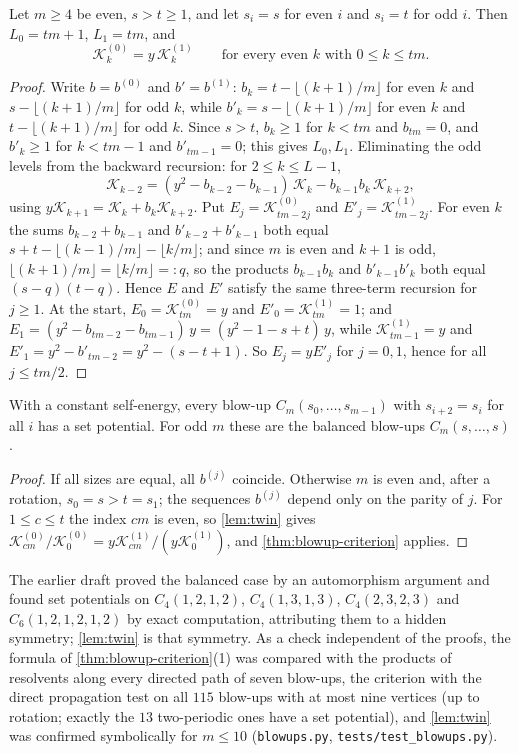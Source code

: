 \documentclass[final]{siamart0516}
\numberwithin{theorem}{section}
\numberwithin{equation}{section}
\theoremstyle{siamnonum}
\theoremstyle{plain}
\newcommand{\code}[1]{{\ttfamily\nolinkurl{#1}}}
\newcommand{\cont}{\mathcal{K}}           %
\begin{document}
\begin{lemma}\label{lem:twin}
Let $m\ge4$ be even, $s>t\ge1$, and let $s_i=s$ for even $i$ and $s_i=t$ for odd $i$. Then $L_0=tm+1$, $L_1=tm$, and
\[
\cont^{(0)}_k=y\,\cont^{(1)}_k\qquad\text{for every even }k\text{ with }0\le k\le tm.
\]
\end{lemma}
\begin{proof}
Write $b=b^{(0)}$ and $b'=b^{(1)}$: $b_k=t-\lfloor(k+1)/m\rfloor$ for even $k$ and $s-\lfloor(k+1)/m\rfloor$ for odd $k$, while $b'_k=s-\lfloor(k+1)/m\rfloor$ for even $k$ and $t-\lfloor(k+1)/m\rfloor$ for odd $k$. Since $s>t$, $b_k\ge1$ for $k<tm$ and $b_{tm}=0$, and $b'_k\ge1$ for $k<tm-1$ and $b'_{tm-1}=0$; this gives $L_0,L_1$. Eliminating the odd levels from the backward recursion: for $2\le k\le L-1$,
\[
\cont_{k-2}=(y^{2}-b_{k-2}-b_{k-1})\,\cont_k-b_{k-1}b_k\,\cont_{k+2},
\]
using $y\cont_{k+1}=\cont_k+b_k\cont_{k+2}$. Put $E_j=\cont^{(0)}_{tm-2j}$ and $E'_j=\cont^{(1)}_{tm-2j}$. For even $k$ the sums $b_{k-2}+b_{k-1}$ and $b'_{k-2}+b'_{k-1}$ both equal $s+t-\lfloor(k-1)/m\rfloor-\lfloor k/m\rfloor$; and since $m$ is even and $k+1$ is odd, $\lfloor(k+1)/m\rfloor=\lfloor k/m\rfloor=:q$, so the products $b_{k-1}b_k$ and $b'_{k-1}b'_k$ both equal $(s-q)(t-q)$. Hence $E$ and $E'$ satisfy the same three-term recursion for $j\ge1$. At the start, $E_0=\cont^{(0)}_{tm}=y$ and $E'_0=\cont^{(1)}_{tm}=1$; and $E_1=(y^{2}-b_{tm-2}-b_{tm-1})\,y=(y^{2}-1-s+t)\,y$, while $\cont^{(1)}_{tm-1}=y$ and $E'_1=y^{2}-b'_{tm-2}=y^{2}-(s-t+1)$. So $E_j=yE'_j$ for $j=0,1$, hence for all $j\le tm/2$.
\end{proof}

\begin{corollary}\label{cor:two-periodic}
With a constant self-energy, every blow-up $C_m(s_0,\dots,s_{m-1})$ with $s_{i+2}=s_i$ for all $i$ has a set potential. For odd $m$ these are the balanced blow-ups $C_m(s,\dots,s)$.
\end{corollary}
\begin{proof}
If all sizes are equal, all $b^{(j)}$ coincide. Otherwise $m$ is even and, after a rotation, $s_0=s>t=s_1$; the sequences $b^{(j)}$ depend only on the parity of $j$. For $1\le c\le t$ the index $cm$ is even, so \cref{lem:twin} gives $\cont^{(0)}_{cm}/\cont^{(0)}_0=y\cont^{(1)}_{cm}/(y\cont^{(1)}_0)$, and \cref{thm:blowup-criterion} applies.
\end{proof}

The earlier draft proved the balanced case by an automorphism argument and found set potentials on $C_4(1,2,1,2)$, $C_4(1,3,1,3)$, $C_4(2,3,2,3)$ and $C_6(1,2,1,2,1,2)$ by exact computation, attributing them to a hidden symmetry; \cref{lem:twin} is that symmetry. As a check independent of the proofs, the formula of \cref{thm:blowup-criterion}(1) was compared with the products of resolvents along every directed path of seven blow-ups, the criterion with the direct propagation test on all $115$ blow-ups with at most nine vertices (up to rotation; exactly the $13$ two-periodic ones have a set potential), and \cref{lem:twin} was confirmed symbolically for $m\le10$ (\code{blowups.py}, \code{tests/test_blowups.py}).
\end{document}
